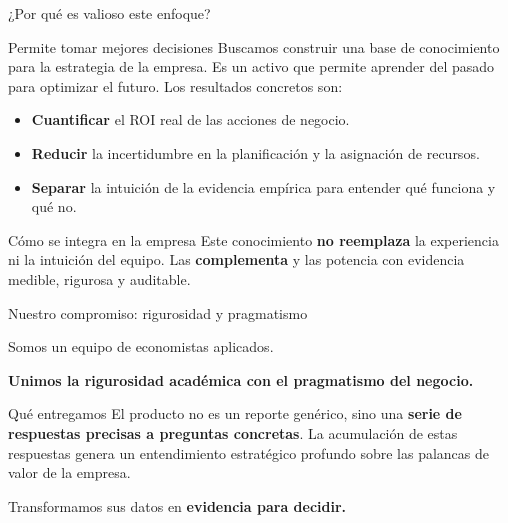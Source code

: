 \documentclass[aspectratio=169]{beamer}
\newcommand{\highlight}[1]{\textcolor{YPFBlue}{\textbf{#1}}}
\newcommand{\soft}[1]{\textcolor{SoftGray}{#1}}
\begin{document}
\begin{frame}{¿Por qué es valioso este enfoque?}

\begin{block}{Permite tomar mejores decisiones}
\justifying
Buscamos construir una base de conocimiento para la estrategia de la empresa. Es un activo que permite aprender del pasado para optimizar el futuro. Los resultados concretos son:
\begin{itemize}
    \item \highlight{Cuantificar} el ROI real de las acciones de negocio.
    \item \highlight{Reducir} la incertidumbre en la planificación y la asignación de recursos.
    \item \highlight{Separar} la intuición de la evidencia empírica para entender qué funciona y qué no.
\end{itemize}
\end{block}

\begin{block}{Cómo se integra en la empresa}
\justifying
Este conocimiento \highlight{no reemplaza} la experiencia ni la intuición del equipo. Las \highlight{complementa} y las potencia con evidencia medible, rigurosa y auditable.
\end{block}
\end{frame}

\begin{frame}{Nuestro compromiso: rigurosidad y pragmatismo}
\begin{center}
\Large
\soft{Somos un equipo de economistas aplicados.}
\vspace{0.4cm}

{\Large \highlight{Unimos la rigurosidad académica con el pragmatismo del negocio.}}
\end{center}

\vspace{1cm}

\begin{block}{Qué entregamos}
\justifying
El producto no es un reporte genérico, sino una \highlight{serie de respuestas precisas a preguntas concretas}. La acumulación de estas respuestas genera un entendimiento estratégico profundo sobre las palancas de valor de la empresa.
\end{block}

\vfill

\begin{center}
\LARGE
\soft{Transformamos sus datos en} \highlight{evidencia para decidir.}
\end{center}
\end{frame}
\end{document}
